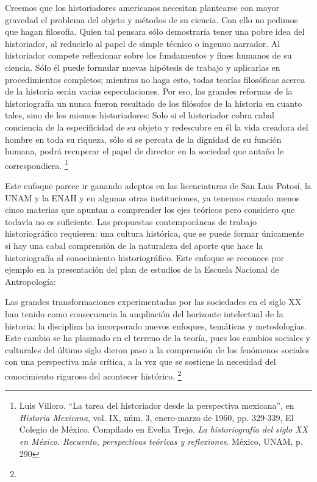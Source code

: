 Creemos que los historiadores americanos necesitan plantearse con mayor 
gravedad el problema del  objeto y métodos de su ciencia. Con ello no 
pedimos que hagan filosofía. Quien tal pensara sólo demostraría tener 
una pobre idea del historiador, al reducirlo al papel de simple técnico 
o ingenuo narrador. Al historiador compete reflexionar sobre los 
fundamentos y fines humanos de su ciencia. Sólo él puede formular 
nuevas hipótesis de trabajo y aplicarlas en procedimientos completos; 
mientras no haga esto, todas teorías filosóficas acerca de la historia 
serán vacías especulaciones. Por eso, las grandes reformas de la 
historiografía un nunca fueron resultado de los filósofos de la 
historia en cuanto tales, sino de los mismos historiadores: Solo si el 
historiador cobra cabal conciencia de la especificidad de su objeto y 
redescubre en él la vida creadora del hombre en toda su riqueza, sólo 
si se percata de la dignidad de su función humana, podrá recuperar el 
papel de director en la sociedad que antaño le correspondiera. 
\footnote{ Luis Villoro. “La tarea del historiador desde la perspectiva 
mexicana”, en \textit{Historia Mexicana}, vol. IX, núm. 3, enero-marzo 
de 1960, pp. 329-339, El Colegio de México. Compilado en Evelia Trejo. 
\textit{La historiografía del siglo XX en México. Recuento, 
perspectivas teóricas y reflexiones}. México, UNAM, p. 290}

Este enfoque parece ir ganando adeptos en las licenciaturas de San Luis
Potosí, la UNAM y la ENAH y en algunas otras instituciones, ya tenemos
cuando menos cinco materias que apuntan a comprender los ejes teóricos pero
considero que todavía no es suficiente. Las propuestas contemporáneas de
trabajo historiográfico requieren: una cultura histórica, que se puede
formar únicamente si hay una cabal comprensión de la naturaleza del aporte
que hace la historiografía al conocimiento historiográfico. Este enfoque se
reconoce por ejemplo en la presentación del plan de estudios de la Escuela
Nacional de Antropología: 

Las grandes transformaciones experimentadas por las sociedades en el siglo
XX han tenido como consecuencia la ampliación del horizonte intelectual de
la historia: la disciplina ha incorporado nuevos enfoques, temáticas y
metodologías. Este cambio se ha plasmado en el terreno de la teoría, pues
los cambios sociales y culturales del último siglo dieron paso a la
comprensión de los fenómenos sociales con una perspectiva más crítica, a la
vez que se sostiene la necesidad del conocimiento riguroso del acontecer
histórico. \footnote{ }

